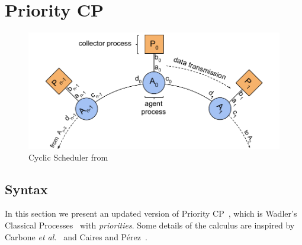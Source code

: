 \documentclass[main.tex]{subfiles}
\begin{document}
\section{Priority CP}

\begin{figure}[t]
  \centering
  \includegraphics[width=0.8\columnwidth]{scheduler}
  \vspace{-4mm}
  \caption{Cyclic Scheduler from \cite{dardha2018}}
  \label{fig:scheduler}
  \vspace{-4mm}
  \end{figure}

\subsection{Syntax}

In this section we present an updated version of Priority CP~\cite{dardha2018}, which is Wadler's Classical Processes~\cite{wadler2012} with \emph{priorities}. Some details of the calculus are inspired by Carbone \emph{et al.}~\cite{carbone2016} and Caires and P\'{e}rez~\cite{caires2017}.
\end{document}
